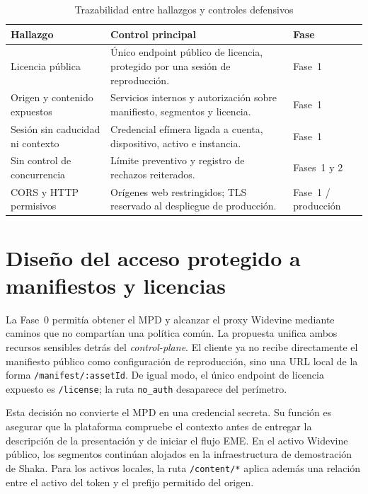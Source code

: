 \begin{table}[H]
\centering
\caption{Trazabilidad entre hallazgos y controles defensivos}
\label{tab:trazabilidad-controles}
\begin{tabularx}{\textwidth}{p{}Yp{0.23\textwidth}}
\toprule
\textbf{Hallazgo} & \textbf{Control principal} & \textbf{Fase} \\
\midrule
Licencia pública & Único endpoint público de licencia, protegido por una sesión de reproducción. & Fase~1 \\
Origen y contenido expuestos & Servicios internos y autorización sobre manifiesto, segmentos y licencia. & Fase~1 \\
Sesión sin caducidad ni contexto & Credencial efímera ligada a cuenta, dispositivo, activo e instancia. & Fase~1 \\
Sin control de concurrencia & Límite preventivo y registro de rechazos reiterados. & Fases~1 y 2 \\
CORS y HTTP permisivos & Orígenes web restringidos; TLS reservado al despliegue de producción. & Fase~1 / producción \\
\bottomrule
\end{tabularx}
\end{table}

\section{Diseño del acceso protegido a manifiestos y licencias}

La Fase~0 permitía obtener el MPD y alcanzar el proxy Widevine mediante caminos que no compartían una política común. La propuesta unifica ambos recursos sensibles detrás del \textit{control-plane}. El cliente ya no recibe directamente el manifiesto público como configuración de reproducción, sino una URL local de la forma \nolinkurl{/manifest/:assetId}. De igual modo, el único endpoint de licencia expuesto es \nolinkurl{/license}; la ruta \nolinkurl{no_auth} desaparece del perímetro.

Esta decisión no convierte el MPD en una credencial secreta. Su función es asegurar que la plataforma compruebe el contexto antes de entregar la descripción de la presentación y de iniciar el flujo EME. En el activo Widevine público, los segmentos continúan alojados en la infraestructura de demostración de Shaka. Para los activos locales, la ruta \nolinkurl{/content/*} aplica además una relación entre el activo del token y el prefijo permitido del origen.

